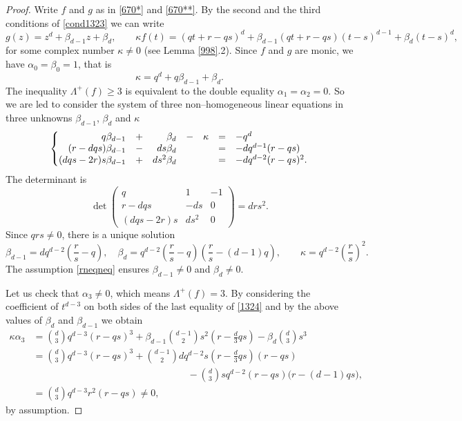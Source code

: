 \documentclass[10pt]{article}
\theoremstyle{definition}
\numberwithin{equation}{section}
\begin{document}
 \begin{proof}
 
Write $f$ and $g$ as in \eqref{670*} and \eqref{670**}. By the second and the third conditions of \eqref{cond1323} we can write
\begin{equation}\label{1324}
g(z)=z^d+\beta_{d-1}z+\beta_d, \qquad 
\kappa f(t)= (qt+r-qs)^d+\beta_{d-1} (qt+r-qs)(t-s)^{d-1}+\beta_d(t-s)^d,
\end{equation}
for some complex number $\kappa\neq 0$ (see Lemma \ref{998}.2). 
Since $f$ and $g$ are monic, we have $\alpha_0=\beta_0=1$, that is
\[
\kappa=q^d+q\beta_{d-1}+\beta_d.
\]
The inequality $\Lambda^+(f)\geqslant 3$ is equivalent to the double equality $\alpha_1=\alpha_2=0$. So we are led to consider 
 the system of three non--homogeneous linear equations in three unknowns $\beta_{d-1}$, $\beta_d$ and
 $\kappa$
\begin{equation}\label{equation:system}
\left\{
\begin{matrix}
\hfill
q\beta_{d-1}&+&
\hfill\beta_d&-&\kappa&=&-q^d\hfill
\\
\hfill
(r-dqs)\beta_{d-1}&-&\hfill
ds\beta_d&&&=&-dq^{d-1}(r-qs)\hfill
\\
\hfill
(dqs-2r)s\beta_{d-1}&+&\hfill
d s^2\beta_d&&&=&-dq^{d-2}(r-qs)^2.\hfill
\end{matrix}
\right.
\end{equation}
The determinant is 
\[
\det\begin{pmatrix}
q&1&-1 
\\
r-dqs&-ds&0 
\\
(dqs-2r)s&d s^2&0
\end{pmatrix}=drs^2.
\]
Since $qrs\not=0$,
there is a unique solution
\[
\beta_{d-1}=d q^{d-2}\left(\frac r s -q\right),
\quad
\beta_d=q^{d-2}\left(\frac r s -q\right)\left(\frac r s -(d-1)q\right),
\qquad
\kappa=q^{d-2}\left(\frac r s \right)^2.
\]
The assumption \eqref{rneqneq} ensures $\beta_{d-1}\not =0$ and $\beta_d \neq 0$. 

Let us check that $\alpha_3\not=0$, which means $\Lambda^+(f)=3$. By considering the coefficient of $t^{d-3}$ on both sides of the last equality of \eqref{1324} and by the above values of $\beta_d$ and $\beta_{d-1}$ we obtain 
\[
\begin{aligned}
\kappa\alpha_3
&= \binom d 3 q^{d-3}(r-qs)^3+\beta_{d-1} \binom {d-1} 2 s^2\left( r-\frac d 3 qs\right)-\beta_d \binom d 3 s^3 
\\
&= \binom d 3 q^{d-3}(r-qs)^3+ \binom {d-1} 2 dq^{d-2}s\left( r-\frac d 3 qs\right) (r -qs) \\
& \qquad \qquad \qquad \qquad \qquad \qquad \qquad \qquad - \binom d 3 s q^{d-2}( r -qs)\bigl( r -(d-1)qs\bigr),
\\
&= \binom d 3 q^{d-3}r^2(r-qs)\not=0,
\end{aligned}
\]
by assumption. 
 \end{proof}
 
\end{document}
